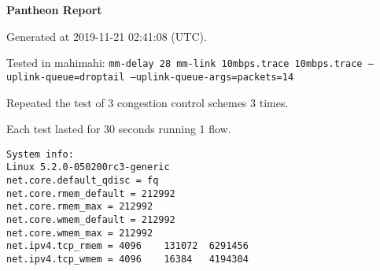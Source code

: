\documentclass{article}
\begin{document}
\centerline{\textbf{\large{Pantheon Report}}}
\vspace{20pt}

Generated at 2019-11-21 02:41:08 (UTC).

Tested in mahimahi: \texttt{mm-delay 28 mm-link 10mbps.trace 10mbps.trace --uplink-queue=droptail --uplink-queue-args=packets=14}

Repeated the test of 3 congestion control schemes 3 times.

Each test lasted for 30 seconds running 1 flow.

\begin{verbatim}
System info:
Linux 5.2.0-050200rc3-generic
net.core.default_qdisc = fq
net.core.rmem_default = 212992
net.core.rmem_max = 212992
net.core.wmem_default = 212992
net.core.wmem_max = 212992
net.ipv4.tcp_rmem = 4096	131072	6291456
net.ipv4.tcp_wmem = 4096	16384	4194304
\end{verbatim}
\end{document}
